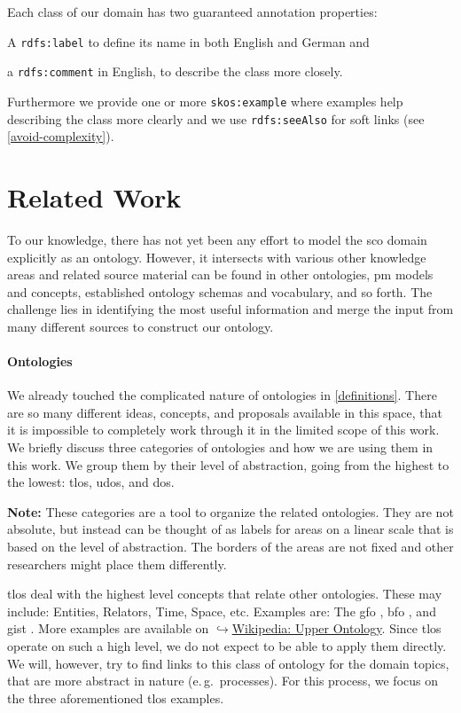 \documentclass[a4paper, DIV=13, BCOR=0cm]{scrbook}
\newcommand{\eg}{e.\,g.\ }
\newcommand{\prop}[1]{\texttt{#1}}
\newcommand{\link}[2]{\href{#1}{$\hookrightarrow$#2}}
\begin{document}
Each class of our domain has two guaranteed annotation properties:
\begin{inparaenum}
	\item A \prop{rdfs:label} to define its name in both English and German and
	\item a \prop{rdfs:comment} in English, to describe the class more closely.
\end{inparaenum}
Furthermore we provide one or more \prop{skos:example} where examples help describing the class more clearly and we use \prop{rdfs:seeAlso} for soft links (see \autoref{avoid-complexity}).

\section{Related Work }
\label{related-work}
To our knowledge, there has not yet been any effort to model the \gls{sco} domain explicitly as an ontology. However, it intersects with various other knowledge areas and related source material can be found in other ontologies, \gls{pm} models and concepts, established ontology schemas and vocabulary, and so forth. The challenge lies in identifying the most useful information and merge the input from many different sources to construct our ontology.

\paragraph{Ontologies}
We already touched the complicated nature of ontologies in \autoref{definitions}. There are so many different ideas, concepts, and proposals available in this space, that it is impossible to completely work through it in the limited scope of this work. We briefly discuss three categories of ontologies and how we are using them in this work. We group them by their level of abstraction, going from the highest to the lowest: \glspl{tlo}, \glspl{udo}, and \glspl{do}.

\begin{mdframed}
	\textbf{Note:} These categories are a tool to organize the related ontologies. They are not absolute, but instead can be thought of as labels for areas on a linear scale that is based on the level of abstraction. The borders of the areas are not fixed and other researchers might place them differently.
\end{mdframed}

\glspl{tlo} deal with the highest level concepts that relate other ontologies. \cite[p.\,3]{perez1999overview} These may include: Entities, Relators, Time, Space, etc. Examples are: The %
	\gls{gfo} \cite{herre2010general},
	\gls{bfo} \cite{smith2015basic}, and
	\gls{gist} \cite{gist-ontology}.
More examples are available on  \link{https://en.wikipedia.org/wiki/Upper\_ontology\#Available\_upper\_ontologies}{Wikipedia: Upper Ontology}. Since \glspl{tlo} operate on such a high level, we do not expect to be able to apply them directly. We will, however, try to find links to this class of ontology for the domain topics, that are more abstract in nature (\eg processes). For this process, we focus on the three aforementioned \glspl{tlo} examples.
\end{document}
